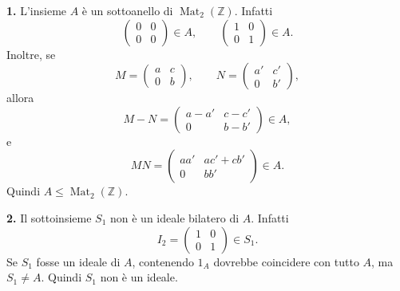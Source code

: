 \documentclass[a4paper]{article}
\begin{document}
\begin{radioactive}
\begin{snippetsolution}{}
    \textbf{1.} L'insieme \(A\) è un sottoanello di \(\operatorname{Mat}_2(\mathbb{Z})\).
    Infatti
    \[
        \begin{pmatrix}
            0 & 0 \\
            0 & 0
        \end{pmatrix}\in A,
        \qquad
        \begin{pmatrix}
            1 & 0 \\
            0 & 1
        \end{pmatrix}\in A.
    \]
    Inoltre, se
    \[
        M=
        \begin{pmatrix}
            a & c \\
            0 & b
        \end{pmatrix},
        \qquad
        N=
        \begin{pmatrix}
            a' & c' \\
            0 & b'
        \end{pmatrix},
    \]
    allora
    \[
        M-N=
        \begin{pmatrix}
            a-a' & c-c' \\
            0 & b-b'
        \end{pmatrix}\in A,
    \]
    e
    \[
        MN=
        \begin{pmatrix}
            aa' & ac'+cb' \\
            0 & bb'
        \end{pmatrix}\in A.
    \]
    Quindi \(A\leq \operatorname{Mat}_2(\mathbb{Z})\).

    \textbf{2.}
    Il sottoinsieme \(S_1\) non è un ideale bilatero di \(A\).
    Infatti
    \[
        I_2=
        \begin{pmatrix}
            1 & 0 \\
            0 & 1
        \end{pmatrix}
        \in S_1.
    \]
    Se \(S_1\) fosse un ideale di \(A\), contenendo \(1_A\) dovrebbe coincidere con tutto \(A\), ma \(S_1\neq A\).
    Quindi \(S_1\) non è un ideale.


\end{snippetsolution}
\end{radioactive}
\end{document}
